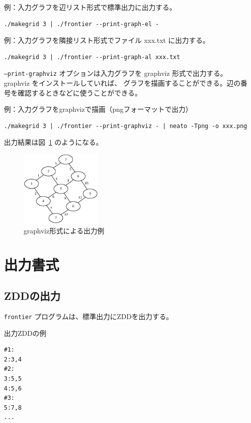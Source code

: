\documentclass{jsarticle}
\begin{document}
例：入力グラフを辺リスト形式で標準出力に出力する。
\begin{verbatim}
./makegrid 3 | ./frontier --print-graph-el -
\end{verbatim}

例：入力グラフを隣接リスト形式でファイル xxx.txt に出力する。
\begin{verbatim}
./makegrid 3 | ./frontier --print-graph-al xxx.txt
\end{verbatim}

\texttt{--print-graphviz} オプションは入力グラフを
graphviz 形式で出力する。graphviz をインストールしていれば、
グラフを描画することができる。辺の番号を確認するときなどに使うことができる。

例：入力グラフをgraphvizで描画（pngフォーマットで出力）
\begin{verbatim}
./makegrid 3 | ./frontier --print-graphviz - | neato -Tpng -o xxx.png
\end{verbatim}

出力結果は図~\ref{fig:graphviz_example} のようになる。

\begin{figure}[h]
  \begin{center}
    \includegraphics[width=40mm]{graphviz_example.eps}
  \end{center}
  \caption{graphviz形式による出力例}
  \label{fig:graphviz_example}
\end{figure}

\section{出力書式}

\subsection{ZDDの出力} \label{sec:outputzdd}

\texttt{frontier} プログラムは、標準出力にZDDを出力する。

出力ZDDの例

\begin{verbatim}
#1:
2:3,4
#2:
3:5,5
4:5,6
#3:
5:7,8
...
\end{verbatim}
\end{document}
